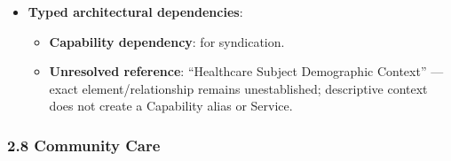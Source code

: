 \begin{itemize}
\begin{itemize}
\begin{itemize}
\item 
\emph{Exposed Service}: \texttt{} — Discloses screening due dates to primary care providers.



\end{itemize}


\end{itemize}


\item 
\textbf{Typed architectural dependencies}:


\begin{itemize}

\item 
\textbf{Capability dependency}: \texttt{} for syndication.



\item 
\textbf{Unresolved reference}: “Healthcare Subject Demographic Context” — exact element/\allowbreak{}relationship remains unestablished; descriptive context does not create a Capability alias or Service.



\end{itemize}


\end{itemize}
\label{rad:sd:178}

\par\smallskip
{}\label{rad:sd:180}



\label{rad:sd:182}
\subsubsection*{2.8 Community Care}
\label{rad:sd:183}

